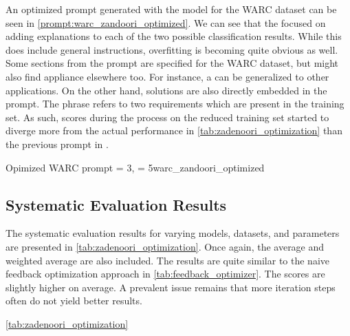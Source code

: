 An optimized prompt generated with the \gpt model for the WARC dataset can be seen in \autoref{prompt:warc_zandoori_optimized}.
We can see that the \LLM focused on adding explanations to each of the two possible classification results.
While this does include general instructions, overfitting is becoming quite obvious as well.
Some sections from the prompt are specified for the WARC dataset, but might also find appliance elsewhere too.
For instance, a  can be generalized to other applications.
On the other hand, solutions are also directly embedded in the prompt.
The phrase  refers to two requirements which are present in the training set.
As such, \fone scores during the \APE process on the reduced training set started to diverge more from the actual performance in \autoref{tab:zadenoori_optimization} than the previous prompt in .

\begin{prompt}{Opimized WARC prompt \feed = 3, \iter = 5}{warc_zandoori_optimized}
    \\
    
\end{prompt}

\subsection{Systematic Evaluation Results}
\label{subsec:Evaluation:varying-the-optimization-prompt:systematic-evaluation-results}

The systematic evaluation results for varying models, datasets, and parameters are presented in \autoref{tab:zadenoori_optimization}.
Once again, the average and weighted average are also included.
The results are quite similar to the naive feedback optimization approach in \autoref{tab:feedback_optimizer}.
The \fone scores are slightly higher on average.
A prevalent issue remains that more iteration steps often do not yield better results.

\autoref{tab:zadenoori_optimization} 

\begin{table}
    \centering
    \renewcommand{\arraystretch}{1.4}
    
    \renewcommand{\arraystretch}{1}
    \caption{Naive prompt optimization approach using the optimization prompt by }
    \label{tab:zadenoori_optimization}
\end{table}